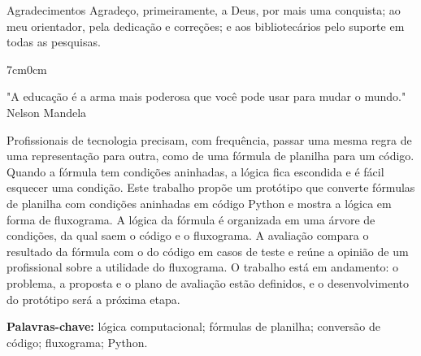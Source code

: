 \documentclass[
	12pt,	
    oneside,
    a4paper,
    brazil  
]{abntex2}
\begin{document}
\newpage
\begin{agradecimento}{Agradecimentos}
Agradeço, primeiramente, a Deus, por mais uma conquista; ao meu orientador, pela dedicação e correções; e aos bibliotecários pelo suporte em todas as pesquisas.

\end{agradecimento}


\newpage
\begin{adjustwidth}{7cm}{0cm}
\vspace*{\fill}
\begin{flushright}
"A educação é a arma mais poderosa que você pode usar para mudar o mundo." \\
\vspace*{10pt}
Nelson Mandela
\end{flushright}
\end{adjustwidth}


\newpage
\begin{resumo2}
Profissionais de tecnologia precisam, com frequência, passar uma mesma regra de uma representação para outra, como de uma fórmula de planilha para um código. Quando a fórmula tem condições aninhadas, a lógica fica escondida e é fácil esquecer uma condição. Este trabalho propõe um protótipo que converte fórmulas de planilha com condições aninhadas em código Python e mostra a lógica em forma de fluxograma. A lógica da fórmula é organizada em uma árvore de condições, da qual saem o código e o fluxograma. A avaliação compara o resultado da fórmula com o do código em casos de teste e reúne a opinião de um profissional sobre a utilidade do fluxograma. O trabalho está em andamento: o problema, a proposta e o plano de avaliação estão definidos, e o desenvolvimento do protótipo será a próxima etapa.

\vspace*{20pt}
\textbf{Palavras-chave:} lógica computacional; fórmulas de planilha; conversão de código; fluxograma; Python.
\end{resumo2}
\end{document}
